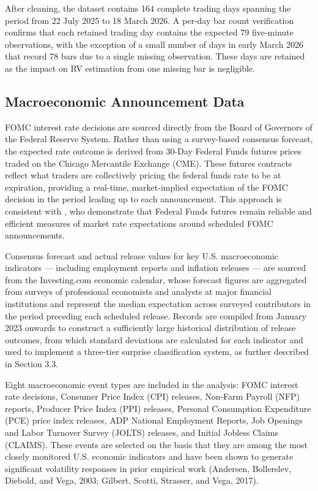 \documentclass[12pt,a4paper]{report}
\begin{document}
After cleaning, the dataset contains 164 complete trading days spanning the period from 22 July 2025 to 18 March 2026. A per-day bar count verification confirms that each retained trading day contains the expected 79 five-minute observations, with the exception of a small number of days in early March 2026 that record 78 bars due to a single missing observation. These days are retained as the impact on RV estimation from one missing bar is negligible.

\subsection{Macroeconomic Announcement Data}

FOMC interest rate decisions are sourced directly from the Board of Governors of the Federal Reserve System. Rather than using a survey-based consensus forecast, the expected rate outcome is derived from 30-Day Federal Funds futures prices traded on the Chicago Mercantile Exchange (CME). These futures contracts reflect what traders are collectively pricing the federal funds rate to be at expiration, providing a real-time, market-implied expectation of the FOMC decision in the period leading up to each announcement. This approach is consistent with \cite{BauerSwanson2023}, who demonstrate that Federal Funds futures remain reliable and efficient measures of market rate expectations around scheduled FOMC announcements.

Consensus forecast and actual release values for key U.S. macroeconomic indicators — including employment reports and inflation releases — are sourced from the Investing.com economic calendar, whose forecast figures are aggregated from surveys of professional economists and analysts at major financial institutions and represent the median expectation across surveyed contributors in the period preceding each scheduled release. Records are compiled from January 2023 onwards to construct a sufficiently large historical distribution of release outcomes, from which standard deviations are calculated for each indicator and used to implement a three-tier surprise classification system, as further described in Section 3.3.

Eight macroeconomic event types are included in the analysis: FOMC interest rate decisions, Consumer Price Index (CPI) releases, Non-Farm Payroll (NFP) reports, Producer Price Index (PPI) releases, Personal Consumption Expenditure (PCE) price index releases, ADP National Employment Reports, Job Openings and Labor Turnover Survey (JOLTS) releases, and Initial Jobless Claims (CLAIMS). These events are selected on the basis that they are among the most closely monitored U.S. economic indicators and have been shown to generate significant volatility responses in prior empirical work (Andersen, Bollerslev, Diebold, and Vega, 2003; Gilbert, Scotti, Strasser, and Vega, 2017).
\end{document}
